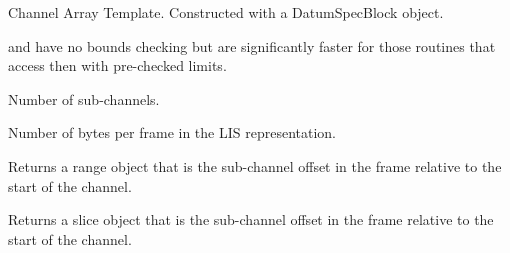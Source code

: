 \documentclass[letterpaper,10pt,english]{sphinxmanual}
\begin{document}

\begin{fulllineitems}
\label{\detokenize{ref/LIS/core/FrameSet:TotalDepth.LIS.core.FrameSet.ChArTe}}
Channel Array Template. Constructed with a DatumSpecBlock object.

 and  have no bounds checking but are
significantly faster for those routines that access then with
pre-checked limits.

\begin{fulllineitems}
\label{\detokenize{ref/LIS/core/FrameSet:TotalDepth.LIS.core.FrameSet.ChArTe.numSubChannels}}
Number of sub-channels.

\end{fulllineitems}


\begin{fulllineitems}
\label{\detokenize{ref/LIS/core/FrameSet:TotalDepth.LIS.core.FrameSet.ChArTe.lisSize}}
Number of bytes per frame in the LIS representation.

\end{fulllineitems}


\begin{fulllineitems}
\label{\detokenize{ref/LIS/core/FrameSet:TotalDepth.LIS.core.FrameSet.ChArTe.subChOffsRange}}
Returns a range object that is the sub-channel offset in the frame
relative to the start of the channel.

\end{fulllineitems}


\begin{fulllineitems}
\label{\detokenize{ref/LIS/core/FrameSet:TotalDepth.LIS.core.FrameSet.ChArTe.subChOffsSlice}}
Returns a slice object that is the sub-channel offset in the frame
relative to the start of the channel.


\end{fulllineitems}
\end{fulllineitems}
\end{document}
